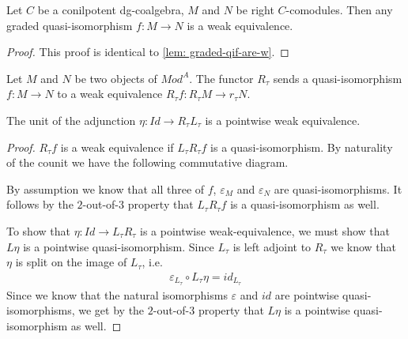 \documentclass[../thesis.tex]{subfiles}
\begin{document}
            \begin{lemma}
                Let $C$ be a conilpotent dg-coalgebra, $M$ and $N$ be right $C$-comodules. Then any graded quasi-isomorphism $f: M \rightarrow N$ is a weak equivalence.
            \end{lemma}

            \begin{proof}
                This proof is identical to \ref{lem: graded-qif-are-w}.   
            \end{proof}

            \begin{lemma}
                Let $M$ and $N$ be two objects of $Mod^A$. The functor $R_\tau$ sends a quasi-isomorphism $f: M \rightarrow N$ to a weak equivalence $R_\tau f: R_\tau M \rightarrow r_\tau N$.

                The unit of the adjunction $\eta : Id \rightarrow R_\tau L_\tau$ is a pointwise weak equivalence.
            \end{lemma}

            \begin{proof}
                $R_\tau f$ is a weak equivalence if $L_\tau R_\tau f$ is a quasi-isomorphism. By naturality of the counit we have the following commutative diagram.
                \begin{center}
                \end{center}

                By assumption we know that all three of $f$, $\varepsilon_M$ and $\varepsilon_N$ are quasi-isomorphisms. It follows by the $2$-out-of-$3$ property that $L_\tau R_\tau f$ is a quasi-isomorphism as well.

                To show that $\eta : Id \rightarrow L_\tau R_\tau$ is a pointwise weak-equivalence, we must show that $L\eta$ is a pointwise quasi-isomorphism. Since $L_\tau$ is left adjoint to $R_\tau$ we know that $\eta$ is split on the image of $L_\tau$, i.e.
                \begin{align*}
                    \varepsilon_{L_\tau}\circ L_\tau\eta = id_{L_\tau}
                \end{align*}
                Since we know that the natural isomorphisms $\varepsilon$ and $id$ are pointwise quasi-isomorphisms, we get by the $2$-out-of-$3$ property that $L\eta$ is a pointwise quasi-isomorphism as well.
            \end{proof}
\end{document}
